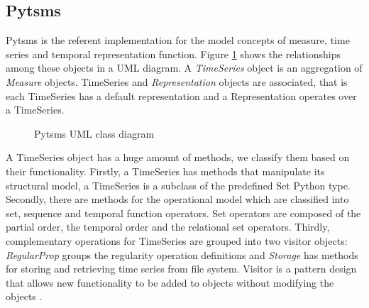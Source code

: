 \subsection{Pytsms}

Pytsms is the referent implementation for the model concepts of
measure, time series and temporal representation function.  Figure
\ref{fig:implementacio:pytsms-uml} shows the relationships among these
objects in a UML diagram. A \emph{TimeSeries} object is an aggregation
of \emph{Measure} objects. TimeSeries and \emph{Representation}
objects are associated, that is each TimeSeries has a default
representation and a Representation operates over a TimeSeries.

\begin{figure}[tp]
  \centering



  \caption{Pytsms UML class diagram}
  \label{fig:implementacio:pytsms-uml}
\end{figure}




A TimeSeries object has a huge amount of methods, we classify them
based on their functionality. Firstly, a TimeSeries has methods that
manipulate its structural model, a TimeSeries is a subclass of the
predefined Set Python type. Secondly, there are methods for the
operational model which are classified into set, sequence and temporal
function operators.  Set operators are composed of the partial order,
the temporal order and the relational set operators.  Thirdly,
complementary operations for TimeSeries are grouped into two visitor
objects: \emph{RegularProp} groups the regularity operation
definitions and \emph{Storage} has methods for storing and retrieving
time series from file system. Visitor is a pattern design that allows
new functionality to be added to objects without modifying the
objects \cite{ziade08:expert_python_programming:visitor,martin02:visitor}.


